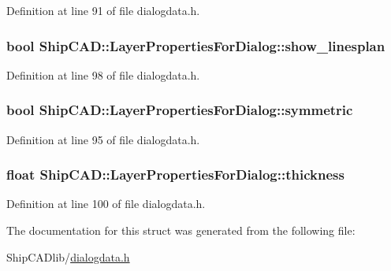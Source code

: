 Definition at line 91 of file dialogdata.\+h.

\subsubsection[{\texorpdfstring{show\+\_\+linesplan}{show_linesplan}}]{\setlength{\rightskip}{0pt plus 5cm}bool Ship\+C\+A\+D\+::\+Layer\+Properties\+For\+Dialog\+::show\+\_\+linesplan}\hypertarget{structShipCAD_1_1LayerPropertiesForDialog_a7df2aaba3b7824534100f46546d9479e}{}\label{structShipCAD_1_1LayerPropertiesForDialog_a7df2aaba3b7824534100f46546d9479e}


Definition at line 98 of file dialogdata.\+h.

\subsubsection[{\texorpdfstring{symmetric}{symmetric}}]{\setlength{\rightskip}{0pt plus 5cm}bool Ship\+C\+A\+D\+::\+Layer\+Properties\+For\+Dialog\+::symmetric}\hypertarget{structShipCAD_1_1LayerPropertiesForDialog_a3acf39b44721d89ea8906052cc0bedde}{}\label{structShipCAD_1_1LayerPropertiesForDialog_a3acf39b44721d89ea8906052cc0bedde}


Definition at line 95 of file dialogdata.\+h.

\subsubsection[{\texorpdfstring{thickness}{thickness}}]{\setlength{\rightskip}{0pt plus 5cm}float Ship\+C\+A\+D\+::\+Layer\+Properties\+For\+Dialog\+::thickness}\hypertarget{structShipCAD_1_1LayerPropertiesForDialog_aeeae5cf44e195fe6f70d4f09a4fa3fef}{}\label{structShipCAD_1_1LayerPropertiesForDialog_aeeae5cf44e195fe6f70d4f09a4fa3fef}


Definition at line 100 of file dialogdata.\+h.



The documentation for this struct was generated from the following file\+:\begin{DoxyCompactItemize}
\item 
Ship\+C\+A\+Dlib/\hyperlink{dialogdata_8h}{dialogdata.\+h}\end{DoxyCompactItemize}
